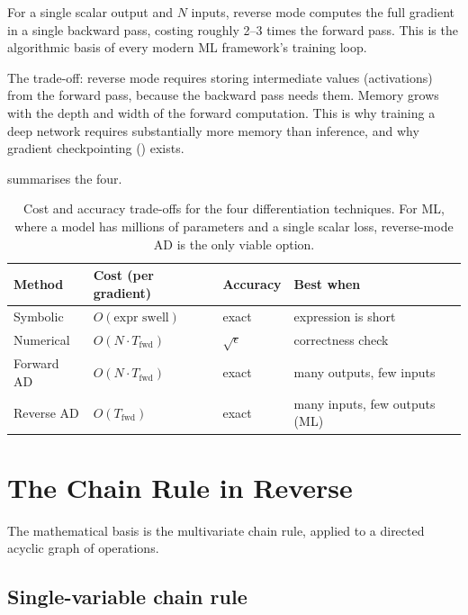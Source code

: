 For a single scalar output and $N$ inputs, reverse mode computes
the full gradient in a single backward pass, costing roughly 2--3
times the forward pass. This is the algorithmic basis of every
modern ML framework's training loop.

The trade-off: reverse mode requires storing intermediate values
(activations) from the forward pass, because the backward pass
needs them. Memory grows with the depth and width of the forward
computation. This is why training a deep network requires
substantially more memory than inference, and why gradient
checkpointing () exists.

 summarises the four.

\begin{table}[t]
\centering
\small
\begin{tabular}{llll}
\toprule
Method & Cost (per gradient) & Accuracy & Best when \\
\midrule
Symbolic     & $O(\text{expr swell})$ & exact          & expression is short \\
Numerical    & $O(N \cdot T_{\text{fwd}})$ & $\sqrt{\epsilon}$  & correctness check \\
Forward AD   & $O(N \cdot T_{\text{fwd}})$ & exact          & many outputs, few inputs \\
Reverse AD   & $O(T_{\text{fwd}})$         & exact          & many inputs, few outputs (ML) \\
\bottomrule
\end{tabular}
\caption[AD method comparison.]{Cost and accuracy trade-offs for
the four differentiation techniques. For ML, where a model has
millions of parameters and a single scalar loss, reverse-mode AD
is the only viable option.}
\label{tab:ad_theory:comparison}
\end{table}

\section{The Chain Rule in Reverse}
\label{sec:ad_theory:chain_rule_reverse}

The mathematical basis is the multivariate chain rule, applied to
a directed acyclic graph of operations.

\subsection{Single-variable chain rule}
\label{ssec:ad_theory:chain_single}

